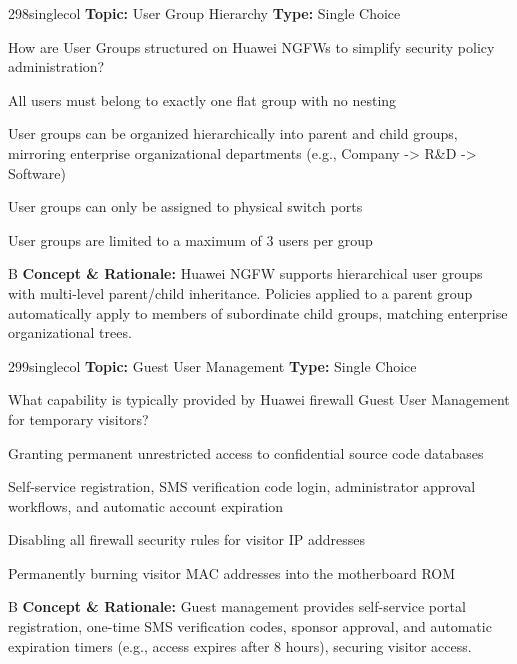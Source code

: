 \begin{qcard}{298}{singlecol}
\textcolor{darkslate!75}{\small\textbf{Topic:} User Group Hierarchy \hfill \textbf{Type:} Single Choice}\vspace{0.4em}\par
How are User Groups structured on Huawei NGFWs to simplify security policy administration?
\begin{qoptions}
\item All users must belong to exactly one flat group with no nesting
\item User groups can be organized hierarchically into parent and child groups, mirroring enterprise organizational departments (e.g., Company -\textgreater{} R\&D -\textgreater{} Software)
\item User groups can only be assigned to physical switch ports
\item User groups are limited to a maximum of 3 users per group
\end{qoptions}
\end{qcard}
\nopagebreak
\begin{explainbox}{B}
\textbf{Concept \& Rationale:} Huawei NGFW supports hierarchical user groups with multi-level parent/child inheritance. Policies applied to a parent group automatically apply to members of subordinate child groups, matching enterprise organizational trees.
\end{explainbox}

\begin{qcard}{299}{singlecol}
\textcolor{darkslate!75}{\small\textbf{Topic:} Guest User Management \hfill \textbf{Type:} Single Choice}\vspace{0.4em}\par
What capability is typically provided by Huawei firewall Guest User Management for temporary visitors?
\begin{qoptions}
\item Granting permanent unrestricted access to confidential source code databases
\item Self-service registration, SMS verification code login, administrator approval workflows, and automatic account expiration
\item Disabling all firewall security rules for visitor IP addresses
\item Permanently burning visitor MAC addresses into the motherboard ROM
\end{qoptions}
\end{qcard}
\nopagebreak
\begin{explainbox}{B}
\textbf{Concept \& Rationale:} Guest management provides self-service portal registration, one-time SMS verification codes, sponsor approval, and automatic expiration timers (e.g., access expires after 8 hours), securing visitor access.
\end{explainbox}

